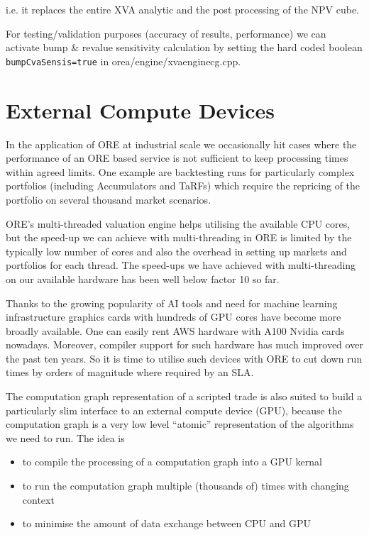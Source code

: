 \documentclass[12pt, a4paper]{report}
\begin{document}
i.e. it replaces the entire XVA analytic and the post processing of the NPV cube.

For testing/validation purposes (accuracy of results, performance) we can activate bump \& revalue sensitivity
calculation by setting the hard coded boolean {\tt bumpCvaSensis=true} in orea/engine/xvaenginecg.cpp.

\section{External Compute Devices}

In the application of ORE at industrial scale we occasionally hit cases where the performance of
an ORE based service is not sufficient to keep processing times within agreed limits. One example
are backtesting runs for particularly complex portfolios (including Accumulators and TaRFs) which
require the repricing of the portfolio on several thousand market scenarios.

ORE's multi-threaded valuation engine helps utilising the available CPU cores, but the speed-up we
can achieve with multi-threading in ORE is limited by the typically low number of cores and also
the overhead in setting up markets and portfolios for each thread. The speed-ups we have achieved
with multi-threading on our available hardware has been well below factor 10 so far.

Thanks to the growing popularity of AI tools and need for machine learning infrastructure graphics
cards with hundreds of GPU cores have become more broadly available. One can easily rent AWS
hardware with A100 Nvidia cards nowadays. Moreover, compiler support for such hardware has much improved
over the past ten years. So it is time to utilise such devices with ORE to
cut down run times by orders of magnitude where required by an SLA.

The computation graph representation of a scripted trade is also suited to build a particularly slim
interface to an external compute device (GPU), because the computation graph is a very
low level ``atomic'' representation of the algorithms we need to run. The idea is
\begin{itemize}
\item to compile the processing of a computation graph into a GPU kernal
\item to run the computation graph multiple (thousands of) times with changing context
\item to minimise the amount of data exchange between CPU and GPU
\end{itemize}
\end{document}
